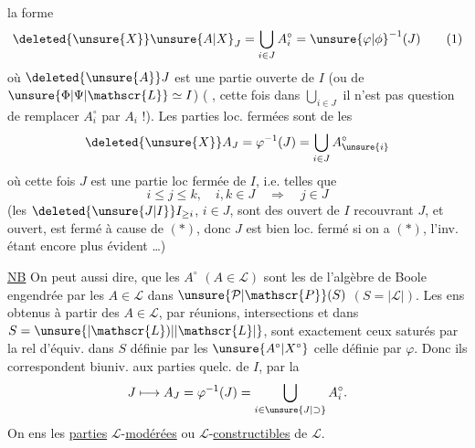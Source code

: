 la forme
\[
 \deleted{\unsure{X}}\unsure{A|X}_J=\bigcup_{i\in J}A_i^\circ={\unsure{\varphi|\phi}}^{-1}(J)
 \tag*{(1)}
\]
où $\deleted{\unsure{A}}J$ est une partie ouverte de $I$ (ou de $\unsure{\Phi|\Psi|\mathscr{L}}\simeq I$) ( , cette fois dans $\displaystyle\bigcup_{i\in J}$ il n'est pas question de remplacer $A_i^\circ$ par $A_i$ !). Les parties loc. fermées sont de  les
\[
 \deleted{\unsure{X}}A_J=\varphi^{-1}(J)=\bigcup_{i\in J}A_{\unsure{i}}^\circ
\]
où cette fois $J$ est une partie loc fermée de $I$, i.e. telles que
\[
 i\leq j\leq k,\quad i,k\in J\quad\Rightarrow\quad j\in J
 \tag*{$(*)$}
\]
(les $\deleted{\unsure{J|I}}I_{\geq i}$, $i\in J$, sont des ouvert de $I$ recouvrant $J$, et  ouvert,  est fermé  à cause de $(*)$, donc $J$ est bien loc. fermé si on a $(*)$, l'inv. étant encore plus évident \ldots)

\uline{NB} On peut aussi dire,  que les $A^\circ$ $(A\in\mathscr{L})$ sont les   de l'algèbre de Boole engendrée par les $A\in\mathscr{L}$ dans $\unsure{\mathcal{P}|\mathscr{P}}(S)$ $(S=|\mathscr{L}|)$. Les ens obtenus à partir des $A\in\mathscr{L}$, par réunions, intersections et  dans $S=\unsure{\lvert\mathscr{L})|\lvert\mathscr{L}\rvert}$, sont exactement ceux saturés par la rel d'équiv. dans $S$ définie par les $\unsure{A^\circ|X^\circ}$  celle définie par $\varphi$. Donc ils correspondent biuniv. aux parties quelc. de $I$, par la 
\[
 J\longmapsto A_J=\varphi^{-1}(J)=\bigcup_{i\in\unsure{J|\supset}}A_i^\circ .
\]
On   ens  les \uline{parties} $\mathscr{L}$-\uline{modérées} ou $\mathscr{L}$-\uline{constructibles} de $\mathscr{L}$.
